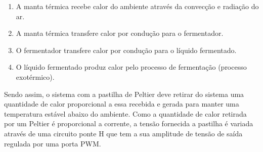 \begin{enumerate}
    \item A manta térmica recebe calor do ambiente através da convecção e radiação do ar. 
    \item A manta térmica transfere calor por condução para o fermentador. 
    \item O fermentador transfere calor por condução para o líquido fermentado. 
    \item O líquido fermentado produz calor pelo processo de fermentação (processo exotérmico).
\end{enumerate}


Sendo assim, o sistema com a pastilha de Peltier deve retirar do sistema uma quantidade de calor proporcional a essa recebida e gerada para manter uma temperatura estável abaixo do ambiente. Como a quantidade de calor retirada por um Peltier é proporcional a corrente, a tensão fornecida a pastilha é variada através de uma circuito ponte H que tem a sua amplitude de tensão de saída regulada por uma porta PWM.  







